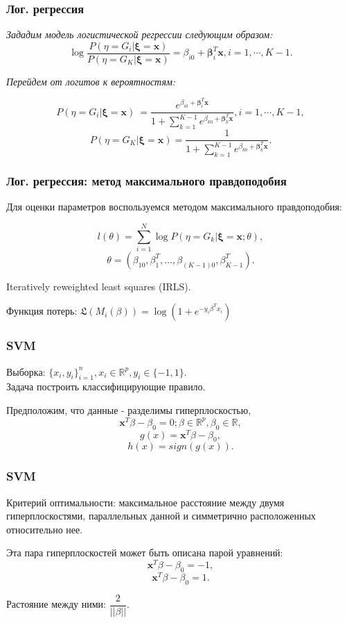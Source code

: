 \documentclass[11pt]{beamer}
\begin{document}
	\begin{frame}
	\frametitle{Лог. регрессия}
			\textit{Зададим модель логистической регрессии следующим образом:}
			$$\log \dfrac{P(\eta = G_i | \bm{\xi} = \bm{x})}{P(\eta = G_K | \bm{\xi} = \bm{x})} = \beta_{i0} + \bm{\beta}_{i}^T \bm{x}, i = 1, \cdots, K-1.$$
			
			\textit{Перейдем от логитов к вероятностям:}
			
			$$P(\eta = G_i | \bm{\xi} = \bm{x})\ = \dfrac{e^{\beta_{i0} + \bm{\beta}_{i}^T \bm{x}} }{1 + \sum_{k = 1}^{K-1} e^{\beta_{k0} + \bm{\beta}_{k}^T \bm{x}}} , i = 1, \cdots, K-1 ,$$
			$$P(\eta = G_K | \bm{\xi} = \bm{x}) = \dfrac{1}{1 + \sum_{k = 1}^{K-1} e^{\beta_{k0} + \bm{\beta}_{k}^T \bm{x}}}.$$
		
	\end{frame}

	\begin{frame}
		\frametitle{Лог. регрессия: метод максимального правдоподобия}
		
		Для оценки параметров воспользуемся методом максимального правдоподобия:
		
			$$ l(\theta) = \sum\limits_{i=1}^{N} \log P(\eta = G_k | \bm{\xi} = \bm{x}; \theta ), $$
			$$ \theta = (\beta_{10}, \beta^T_1, \dotsc, \beta_{(K-1)0}, \beta^T_{K-1}). $$
		

		Iteratively reweighted least squares (IRLS).
		
		\bigskip 
		
		Функция потерь: $\mathfrak{L}(M_i(\beta)) = \log(1 + e^{-y_i \beta^T x_i})$
		
	\end{frame}


	\begin{frame}
		\frametitle{SVM}
	
		Выборка: $\{x_i, y_i\}_{i=1}^{n}, x_i \in \mathbb{R}^{p}, y_i \in \{-1, 1\}$. \\
		Задача построить классифицирующие правило.\\
		
		\bigskip 
		
		Предположим, что данные - разделимы гиперплоскостью,
		$$ \bm{x}^T\beta - \beta_0 = 0; \beta \in  \mathbb{R}^{p}, \beta_0 \in \mathbb{R},$$
		$$ g(x) =  \bm{x}^T\beta - \beta_0, $$
		$$ h(x) =  sign ( g(x) ).$$
	
	\end{frame}

	\begin{frame}
		\frametitle{SVM}
		
		Критерий оптимальности: максимальное расстояние между двумя гиперплоскостями, параллельных данной и симметрично расположенных относительно нее.
		
		\bigskip 
		
		Эта пара гиперплоскостей может быть описана парой уравнений:
		$$ \bm{x}^T \beta - \beta_0 = -1, $$
		$$ \bm{x}^T \beta - \beta_0 = 1. $$
		
		\bigskip 
		
		Растояние между ними: $ \dfrac{2}{||\beta||}. $
	\end{frame}
\end{document}
